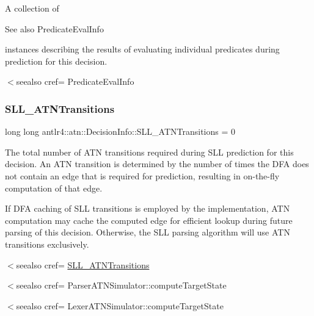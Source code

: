 A collection of \begin{DoxySeeAlso}{See also}
Predicate\+Eval\+Info


\end{DoxySeeAlso}
instances describing the results of evaluating individual predicates during prediction for this decision. 

$<$seealso cref= Predicate\+Eval\+Info \mbox{\label{classantlr4_1_1atn_1_1DecisionInfo_af3e230f5955ff56df52e821b8b8fefd8}} 
\subsubsection{\texorpdfstring{S\+L\+L\+\_\+\+A\+T\+N\+Transitions}{SLL\_ATNTransitions}}
{\footnotesize\ttfamily long long antlr4\+::atn\+::\+Decision\+Info\+::\+S\+L\+L\+\_\+\+A\+T\+N\+Transitions = 0}



The total number of A\+TN transitions required during S\+LL prediction for this decision. An A\+TN transition is determined by the number of times the D\+FA does not contain an edge that is required for prediction, resulting in on-\/the-\/fly computation of that edge. 

If D\+FA caching of S\+LL transitions is employed by the implementation, A\+TN computation may cache the computed edge for efficient lookup during future parsing of this decision. Otherwise, the S\+LL parsing algorithm will use A\+TN transitions exclusively.

$<$seealso cref= \hyperlink{classantlr4_1_1atn_1_1DecisionInfo_af3e230f5955ff56df52e821b8b8fefd8}{S\+L\+L\+\_\+\+A\+T\+N\+Transitions} 

$<$seealso cref= Parser\+A\+T\+N\+Simulator\+::compute\+Target\+State 

$<$seealso cref= Lexer\+A\+T\+N\+Simulator\+::compute\+Target\+State \mbox{\label{classantlr4_1_1atn_1_1DecisionInfo_a95666f6bd1c67636006fc026c7315e5b}} 
